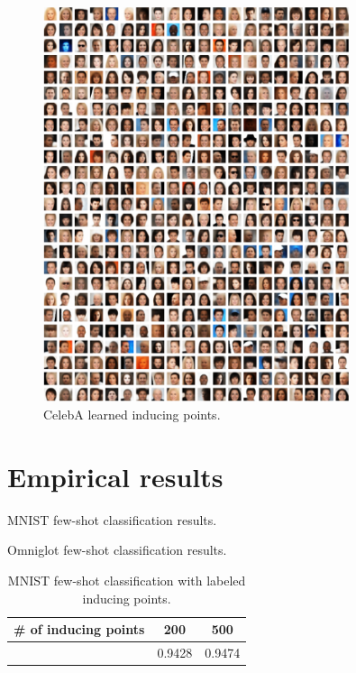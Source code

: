 \begin{figure}[h]
\centering
\includegraphics[width=0.8\textwidth]{img/loracs/celeba/inducing-points.png}
\caption{CelebA learned inducing points.}
\label{fig:celeba-inducing-points}
\end{figure}

\section{Empirical results}

\begin{table}
\scriptsize
\centering
\caption{MNIST few-shot classification results.}
\setlength{\tabcolsep}{2pt}

\label{tab:semisupervised-mnist}
\end{table}

\begin{table}
\scriptsize
\setlength{\tabcolsep}{2pt}
\centering
\caption{Omniglot few-shot classification results.}

\label{tab:semisupervised-omniglot}
\end{table}

\begin{table}
\centering
\caption{MNIST few-shot classification with labeled inducing points.}
\scriptsize
\setlength{\tabcolsep}{2pt}
\begin{tabular}{r|cc}
\toprule
     \# of inducing points &  200 & 500\\
\midrule
        & 0.9428 & 0.9474\\
\bottomrule
\end{tabular}
\label{tab:inducing-point-labels}
\end{table}

